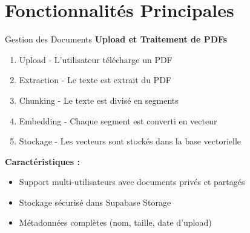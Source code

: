 \documentclass[aspectratio=169]{beamer}
\begin{document}
\section{Fonctionnalités Principales}

\begin{frame}{Gestion des Documents}
    \textbf{Upload et Traitement de PDFs}
    \begin{enumerate}
        \item \textcolor{primaryblue}{Upload} - L'utilisateur télécharge un PDF
        \item \textcolor{primaryblue}{Extraction} - Le texte est extrait du PDF
        \item \textcolor{primaryblue}{Chunking} - Le texte est divisé en segments
        \item \textcolor{primaryblue}{Embedding} - Chaque segment est converti en vecteur
        \item \textcolor{primaryblue}{Stockage} - Les vecteurs sont stockés dans la base vectorielle
    \end{enumerate}
    
    \vspace{0.5cm}
    
    \textbf{Caractéristiques :}
    \begin{itemize}
        \item Support multi-utilisateurs avec documents privés et partagés
        \item Stockage sécurisé dans Supabase Storage
        \item Métadonnées complètes (nom, taille, date d'upload)
    \end{itemize}
\end{frame}
\end{document}
